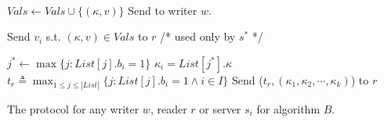 \begin{algorithm*}[!ht]
\begin{algorithmic}[2]
\vspace{-1.7em}
\\\hrulefill
\vspace{-1.5em}
      \begin{multicols}{3}{\footnotesize
            \EndPart
            \Statex
             {
                       \State   $Vals \gets   Vals \cup \{({\kappa}, v)\}$ 
              \State  Send {\ackTag} to writer $w$.
            }\EndPart
            \Statex
            \EndPart
                   
                        \Statex
             {
              \State   Send $v_i$ s.t. $({\kappa}, v) \in Vals$  to  $r$
            }\EndPart 
          \Statex\Statex   /* used only by $s^*$ */
          
           {
                     \State $j^* \leftarrow \max \{ j : List[j].b_i =1 \}$
                     \State ${\kappa}_i = List[j^*].{\kappa}$
           \EndFor 
             \State  $t_r \triangleq \max_{1 \leq j \leq |List|} \{ j : List[j].b_i = 1 \wedge i \in I\}$ 
            \State  Send  ($t_r, ({\kappa}_1,{\kappa}_2, \cdots, {\kappa}_k)$) to $r$
            }\EndPart       
          }\end{multicols}
        \end{algorithmic} 
        \caption{The protocol for any  writer $w$, reader $r$ or server $s_i$ for  algorithm $B$.}\label{fig:algo_b}
      \end{algorithm*}
